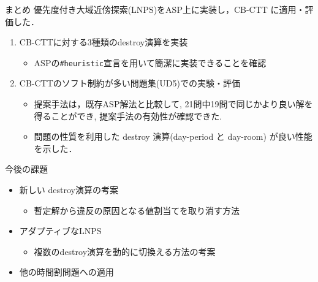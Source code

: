 \documentclass[11pt,dvipdfmx,handout]{beamer}
\begin{document}
\begin{frame}{まとめ}
優先度付き大域近傍探索(LNPS)をASP上に実装し，CB-CTT に適用・評価した．
\begin{enumerate}
\item CB-CTTに対する3種類のdestroy演算を実装
  \begin{itemize}
  \item ASPの\texttt{\#heuristic}宣言を用いて簡潔に実装できることを確認
  \end{itemize}
\item  CB-CTTのソフト制約が多い問題集(UD5)での実験・評価
  \begin{itemize}
  \item  提案手法は，既存ASP解法と比較して, 
  21問中19問で同じかより良い解を得ることができ, 提案手法の有効性が確認できた.
  \item 問題の性質を利用した destroy 演算(day-period と day-room)
    が良い性能を示した．
  \end{itemize}
\end{enumerate}
    
\begin{alertblock}{今後の課題}
  \begin{itemize}
  \item 新しい destroy演算の考案
    \begin{itemize}
    \item 暫定解から違反の原因となる値割当てを取り消す方法
    \end{itemize}
  \item アダプティブなLNPS
    \begin{itemize}
    \item 複数のdestroy演算を動的に切換える方法の考案
    \end{itemize}
  \item 他の時間割問題への適用
  \end{itemize}
\end{alertblock}
\end{frame}
\end{document}
